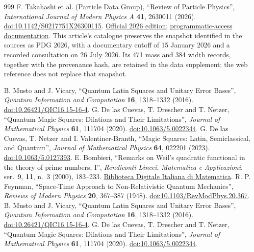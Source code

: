 \begin{thebibliography}{999}
F. Takahashi et al. (Particle Data Group),
``Review of Particle Physics'',
\emph{International Journal of Modern Physics A} \textbf{41}, 2630011 (2026).
\href{https://doi.org/10.1142/S0217751X26300115}{doi:10.1142/S0217751X26300115}.
\href{https://pdg.lbl.gov/2026/}{Official 2026 edition};
\href{https://pdg.lbl.gov/2026/api/index.html}{programmatic-access documentation}.
This article's catalogue preserves the snapshot identified in the sources
as PDG 2026, with a documentary cutoff of 15 January 2026 and a recorded consultation
on 26 July 2026. Its 471 mass and 384 width records, together with the
provenance hash, are retained in the data supplement; the web
reference does not replace that snapshot.

 B. Musto and J. Vicary, ``Quantum Latin Squares and Unitary Error Bases'', \emph{Quantum Information and Computation} \textbf{16}, 1318--1332 (2016). \href{https://doi.org/10.26421/QIC16.15-16-4}{doi:10.26421/QIC16.15-16-4}.
 G. De las Cuevas, T. Drescher and T. Netzer, ``Quantum Magic Squares: Dilations and Their Limitations'', \emph{Journal of Mathematical Physics} \textbf{61}, 111704 (2020). \href{https://doi.org/10.1063/5.0022344}{doi:10.1063/5.0022344}.
 G. De las Cuevas, T. Netzer and I. Valentiner-Branth, ``Magic Squares: Latin, Semiclassical, and Quantum'', \emph{Journal of Mathematical Physics} \textbf{64}, 022201 (2023). \href{https://doi.org/10.1063/5.0127393}{doi:10.1063/5.0127393}.
 E. Bombieri,
``Remarks on Weil's quadratic functional in the theory of prime numbers, I'',
\emph{Rendiconti Lincei. Matematica e Applicazioni},
ser.~9, \textbf{11}, n.~3 (2000), 183--233.
\href{https://www.bdim.eu/item?id=RLIN_2000_9_11_3_183_0}{Biblioteca Digitale Italiana di Matematica}.
 R. P. Feynman, ``Space-Time Approach to Non-Relativistic Quantum Mechanics'', \emph{Reviews of Modern Physics} \textbf{20}, 367--387 (1948). \href{https://doi.org/10.1103/RevModPhys.20.367}{doi:10.1103/RevModPhys.20.367}.
 B. Musto and J. Vicary, ``Quantum Latin Squares and Unitary Error Bases'', \emph{Quantum Information and Computation} \textbf{16}, 1318--1332 (2016). \href{https://doi.org/10.26421/QIC16.15-16-4}{doi:10.26421/QIC16.15-16-4}.
 G. De las Cuevas, T. Drescher and T. Netzer, ``Quantum Magic Squares: Dilations and Their Limitations'', \emph{Journal of Mathematical Physics} \textbf{61}, 111704 (2020). \href{https://doi.org/10.1063/5.0022344}{doi:10.1063/5.0022344}.

\end{thebibliography}
